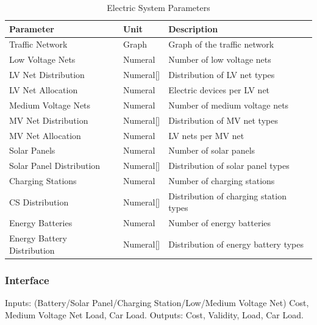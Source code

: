 \begin{table}[h]
	\renewcommand{\arraystretch}{1.3}
	\caption{Electric System Parameters}
	\centering
	\begin{tabular}{lll}
		\hline
		\textbf{Parameter}                    & \textbf{Unit} & \textbf{Description} \\ \hline
		Traffic Network                  	  & Graph          & Graph of the traffic network      \\
		Low Voltage Nets                          & Numeral    & Number of low voltage nets      \\
		LV Net Distribution                          & Numeral[]    & Distribution of LV net types      \\
		LV Net Allocation                          & Numeral    & Electric devices per LV net      \\   
		Medium Voltage Nets                        & Numeral    & Number of medium voltage nets      \\ 
		MV Net Distribution                          & Numeral[]    & Distribution of MV net types      \\
		MV Net Allocation                          & Numeral    & LV nets per MV net      \\   
		Solar Panels                       & Numeral    & Number of solar panels      \\ 
		Solar Panel Distribution                          & Numeral[]    & Distribution of solar panel types      \\  
		Charging Stations                          & Numeral    & Number of charging stations      \\
		CS Distribution                          & Numeral[]    & Distribution of charging station types      \\   
		Energy Batteries                        & Numeral    & Number of energy batteries      \\
		Energy Battery Distribution                          & Numeral[]    & Distribution of energy battery types      \\  \hline 
	\end{tabular}
\end{table}

\subsubsection{Interface}

Inputs: (Battery/Solar Panel/Charging Station/Low/Medium Voltage Net) Cost, Medium Voltage Net Load, Car Load. Outputs: Cost, Validity, Load, Car Load.

